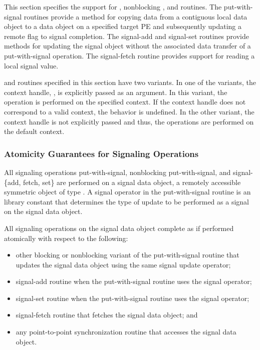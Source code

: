 This section specifies the \openshmem support for ,
nonblocking , and  routines. The
put-with-signal routines provide a method for copying data from a contiguous
local data object to a data object on a specified target \ac{PE} and subsequently
updating a remote flag to signal completion.
The signal-add and signal-set routines provide methods for updating
the signal object without the associated data transfer of a
put-with-signal operation.
The signal-fetch routine provides support for reading a local signal value.

\openshmem {} and 
routines specified in this section have two
variants. In one of the variants, the context handle, , is explicitly
passed as an argument. In this variant, the operation is performed on the
specified context. If the context handle  does not correspond to a
valid context, the behavior is undefined. In the other variant, the context
handle is not explicitly passed and thus, the operations are performed on the
default context.

\subsubsection{Atomicity Guarantees for Signaling Operations}
\label{subsec:signal_atomicity}
All signaling operations put-with-signal, nonblocking put-with-signal, and
signal-\{add, fetch, set\} are performed on a signal data object, a remotely accessible
symmetric object of type . A signal operator in the
put-with-signal routine is an \openshmem library constant that determines the
type of update to be performed as a signal on the signal data object.

All signaling operations on the signal data object complete as if performed
atomically with respect to the following:
\begin{itemize}
    \item other blocking or nonblocking variant of the put-with-signal routine
    that updates the signal data object using the same signal update operator;
    \item signal-add routine when the put-with-signal routine uses the
       signal operator;
    \item signal-set routine when the put-with-signal routine uses the
       signal operator;
    \item signal-fetch routine that fetches the signal data object; and
    \item any point-to-point synchronization routine that accesses the signal
    data object.
\end{itemize}

